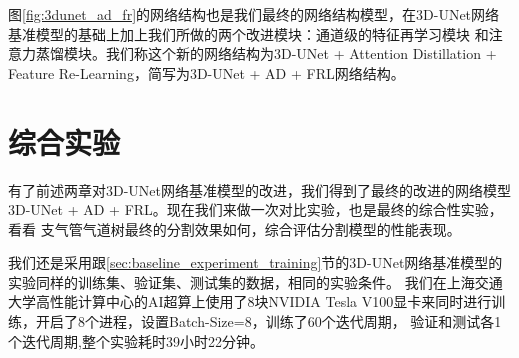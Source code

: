 图\ref{fig:3dunet_ad_fr}的网络结构也是我们最终的网络结构模型，在3D-UNet网络基准模型的基础上加上我们所做的两个改进模块：通道级的特征再学习模块
和注意力蒸馏模块。我们称这个新的网络结构为3D-UNet + Attention Distillation + Feature Re-Learning，简写为3D-UNet + AD + FRL网络结构。

\section{综合实验}

有了前述两章对3D-UNet网络基准模型的改进，我们得到了最终的改进的网络模型3D-UNet + AD + FRL。现在我们来做一次对比实验，也是最终的综合性实验，看看
支气管气道树最终的分割效果如何，综合评估分割模型的性能表现。

我们还是采用跟\ref{sec:baseline_experiment_training}节的3D-UNet网络基准模型的实验同样的训练集、验证集、测试集的数据，相同的实验条件。
我们在上海交通大学高性能计算中心的AI超算上使用了8块NVIDIA Tesla V100显卡来同时进行训练，开启了8个进程，设置Batch-Size=8，训练了60个迭代周期，
验证和测试各1个迭代周期,整个实验耗时39小时22分钟。

